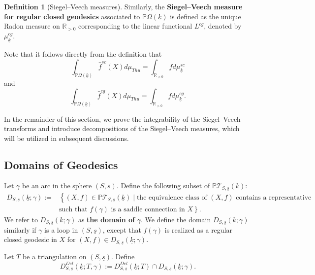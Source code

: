 \documentclass{compositio}
\numberwithin{equation}{section}
\numberwithin{figure}{section}
\theoremstyle{definition}
\newtheorem{definition}{Definition}[section]
\theoremstyle{plain}
\begin{document}
{\begin{definition}[Siegel--Veech measures]
    Similarly, the \textbf{Siegel--Veech measure for regular closed geodesics} associated to $\mathbb{P}\Omega(\underline k)$ is defined as the unique Radon measure on $\mathbb{R}_{>0}$ corresponding to the linear functional $L^{cg}$, denoted by $\mu^{cg}_{\underline k}$.
\end{definition}

Note that it follows directly from the definition that 
\begin{equation}
    \int_{\mathbb{P}\Omega(\underline{k})}\hat{f}^{sc}(X)d\mu_{Thu} = \int_{\mathbb{R}_{>0}} f d\mu^{sc}_{\underline{k}}
\end{equation}
and
\begin{equation}
    \int_{\mathbb{P}\Omega(\underline{k})}\hat{f}^{cg}(X)d\mu_{Thu} = \int_{\mathbb{R}_{>0}} f d\mu^{cg}_{\underline{k}}.
\end{equation}

In the remainder of this section, we prove the integrability of the Siegel--Veech transforms and introduce decompositions of the Siegel--Veech measures, which will be utilized in subsequent discussions.

\subsection{Domains of Geodesics}\label{sec:domain}
Let $\gamma$ be an arc in the sphere $(S, \underline{s})$. Define the following subset of $\mathbb{P}\mathcal{T}_{S, \underline{s}}(\underline{k})$:
\begin{align}\label{equ:domainsc}
    D_{S,\underline{s}}(\underline{k};\gamma) := &\left\{(X, f) \in \mathbb{P}\mathcal{T}_{S, \underline{s}}(\underline{k}) \mid 
    \text{the equivalence class of } (X,f) \text{ contains a representative} \nonumber \right.\\
    &\left. \text{such that } f(\gamma) \text{ is a saddle connection in } X \right\}.
\end{align}
We refer to $D_{S,\underline{s}}(\underline{k};\gamma)$ as \textbf{the domain of} $\gamma$. We define the domain $D_{S,\underline{s}}(\underline{k};\gamma)$ similarly if $\gamma$ is a loop in $(S, \underline{s})$, except that $f(\gamma)$ is realized as a regular closed geodesic in $X$ for $(X, f) \in D_{S,\underline{s}}(\underline{k};\gamma)$.

Let $T$ be a triangulation on $(S,\underline{s})$. Define 
$$
D_{S,\underline{s}}^{Del}(\underline{k};T, \gamma) := D_{S,\underline{s}}^{Del}(\underline{k};T) \cap D_{S,\underline{s}}(\underline{k};\gamma).
$$

}
\end{document}
